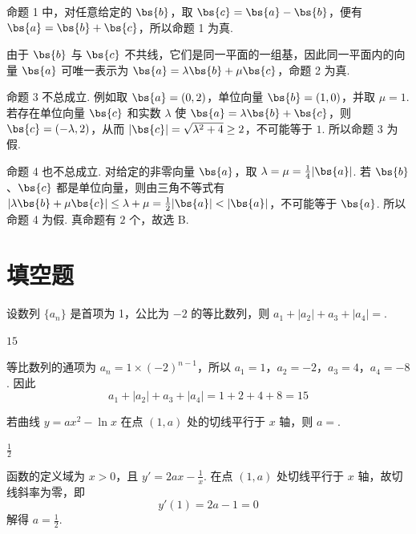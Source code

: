 \begin{solution}
命题 1 中，对任意给定的 \(\bs{b}\)，取 \(\bs{c}=\bs{a}-\bs{b}\)，便有 \(\bs{a}=\bs{b}+\bs{c}\)，所以命题 1 为真.

由于 \(\bs{b}\) 与 \(\bs{c}\) 不共线，它们是同一平面的一组基，因此同一平面内的向量 \(\bs{a}\) 可唯一表示为 \(\bs{a}=\lambda\bs{b}+\mu\bs{c}\)，命题 2 为真.

命题 3 不总成立. 例如取 \(\bs{a}=(0,2)\)，单位向量 \(\bs{b}=(1,0)\)，并取 \(\mu=1\). 若存在单位向量 \(\bs{c}\) 和实数 \(\lambda\) 使 \(\bs{a}=\lambda\bs{b}+\bs{c}\)，则 \(\bs{c}=(-\lambda,2)\)，从而 \(|\bs{c}|=\sqrt{\lambda^2+4}\geq2\)，不可能等于 \(1\). 所以命题 3 为假.

命题 4 也不总成立. 对给定的非零向量 \(\bs{a}\)，取 \(\lambda=\mu=\frac14|\bs{a}|\). 若 \(\bs{b}\)、\(\bs{c}\) 都是单位向量，则由三角不等式有 \(|\lambda\bs{b}+\mu\bs{c}|\leq\lambda+\mu=\frac12|\bs{a}|<|\bs{a}|\)，不可能等于 \(\bs{a}\). 所以命题 4 为假. 真命题有 \(2\) 个，故选 B.
\end{solution}

\section{填空题}

\begin{problem}
设数列 \( \{a_{n}\} \) 是首项为 1，公比为 \(-2\) 的等比数列，则 \( a_{1} + |a_{2}| + a_{3} + |a_{4}| = \)\fillinblank{}.
\end{problem}

\begin{answer}
\(15\)
\end{answer}

\begin{solution}
等比数列的通项为 \(a_n=1\times(-2)^{n-1}\)，所以 \(a_1=1\)，\(a_2=-2\)，\(a_3=4\)，\(a_4=-8\). 因此
\[
a_1+|a_2|+a_3+|a_4|=1+2+4+8=15
\]
\end{solution}

\begin{problem}
若曲线 \( y = ax^2 - \ln x \) 在点 \((1, a)\) 处的切线平行于 \( x \) 轴，则 \( a = \)\fillinblank{}.
\end{problem}

\begin{answer}
\(\frac{1}{2}\)
\end{answer}

\begin{solution}
函数的定义域为 \(x>0\)，且 \(y'=2ax-\frac1x\). 在点 \((1,a)\) 处切线平行于 \(x\) 轴，故切线斜率为零，即
\[
y'(1)=2a-1=0
\]
解得 \(a=\frac12\).
\end{solution}

